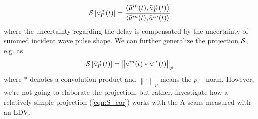 ﻿\documentclass[11pt,a4j]{article}
\begin{document}
\begin{equation}
	{\cal S} \left[ 
		\bar{a}^{sc}_P(t) 
		\right]
	=
	\frac{
		\left< 
			\bar{a}^{in}(t) 
			,\bar{a}^{sc}_P(t) 
		\right>
	}{
		\left<
			\bar{a}^{in}(t) 
			,
			\bar{a}^{in}(t) 
		\right>
	}
	\label{eqn:S_cor}
\end{equation}
where the uncertainty regarding the delay is compensated by the 
uncertainty of summed incident wave pulse shape.
We can further generalize the projection $\cal S$, e.g. as 
\begin{equation}
	{\cal S} \left[ 
		\bar{a}^{sc}_P(t) 
		\right]
	=
	\left\|a^{in}(t)*a^{sc}(t)\right\|_p
	\label{eqn:}
\end{equation}
where $*$ denotes a convolution product and $\left\| \cdot \right\|_p$ means the 
$p-$norm. However, we're not going to elaborate the projection, but rather, investigate 
how a relatively simple projection (\ref{eqn:S_cor}) works with the A-scans measured with an LDV. 
\end{document}
